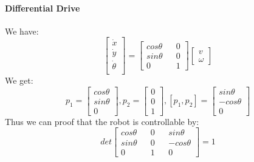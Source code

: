 \paragraph{Differential Drive} We have:
\[
\begin{bmatrix}
	\dot{x}\\
	\dot{y}\\
	\dot{\theta}\\
\end{bmatrix}=
\begin{bmatrix}
	cos \theta && 0\\
	sin \theta && 0\\
	0 && 1
\end{bmatrix}
\begin{bmatrix}
	v\\
	\omega
\end{bmatrix}
\]
We get:
\[
p_1 = \begin{bmatrix}
	cos \theta\\
	sin \theta\\
	0
\end{bmatrix},
p_2 = \begin{bmatrix}
	0\\
	0\\
	1
\end{bmatrix},
[p_1,p_2] = \begin{bmatrix}
	sin \theta\\
	-cos \theta\\
	0
\end{bmatrix}
\]
Thus we can proof that the robot is controllable by:
\[det
\begin{bmatrix}
	cos \theta && 0 && sin \theta \\
	sin \theta && 0 && -cos \theta \\
	0 && 1 && 0
\end{bmatrix} = 1
\]